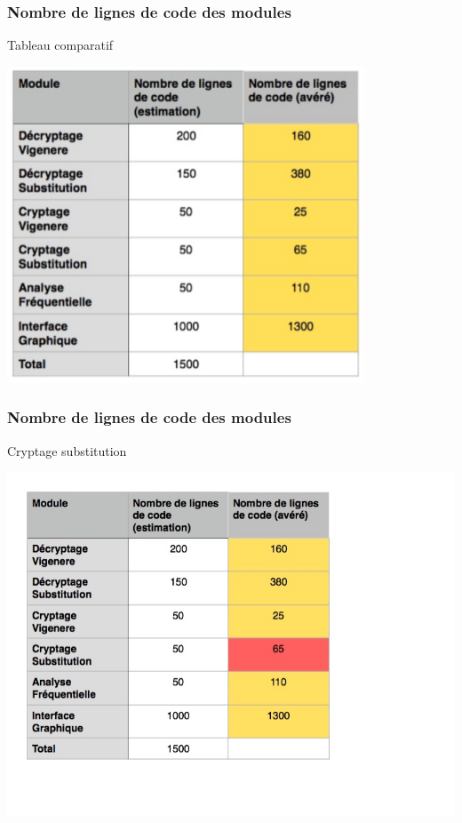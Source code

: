 \documentclass[10pt,xcolor=table]{beamer}
\begin{document}
\begin{frame}
\frametitle{Nombre de lignes de code des modules}
\begin{block}{Tableau comparatif}
\begin{center}
\includegraphics[scale =0.3]{tabl.png} \\ 
\end{center}
\end{block}
\end{frame}


\begin{frame}
\frametitle{Nombre de lignes de code des modules}
\begin{block}{Cryptage substitution}
\begin{center}
\includegraphics[scale =0.3]{preview.jpg} \\ 
\end{center}
\end{block}
\end{frame}
\end{document}
